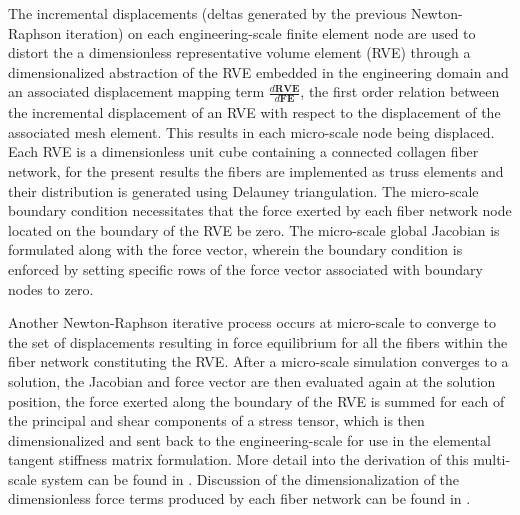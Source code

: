 \documentclass[11pt]{siamltex1213}
\begin{document}
The incremental displacements (deltas generated by the previous Newton-Raphson iteration) on each engineering-scale finite element node are used to distort the a dimensionless representative volume element (RVE) through a dimensionalized abstraction of the RVE embedded in the engineering domain and an associated displacement mapping term $\frac{d\mathbf{RVE}}{d\mathbf{FE}}$, the first order relation between the incremental displacement of an RVE with respect to the displacement of the associated mesh element. This results in each micro-scale node being displaced. Each RVE is a dimensionless unit cube containing a connected collagen fiber network, for the present results the fibers are implemented as truss elements and their distribution is generated using Delauney triangulation. The micro-scale boundary condition necessitates that the force exerted by each fiber network node located on the boundary of the RVE be zero. The micro-scale global Jacobian is formulated along with the force vector, wherein the boundary condition is enforced by setting specific rows of the force vector associated with boundary nodes to zero. 

Another Newton-Raphson iterative process occurs at micro-scale to converge to the set of displacements resulting in force equilibrium for all the fibers within the fiber network constituting the RVE. After a micro-scale simulation converges to a solution, the Jacobian and force vector are then evaluated again at the solution position, the force exerted along the boundary of the RVE is summed for each of the principal and shear components of a stress tensor, which is then dimensionalized and sent back to the engineering-scale for use in the elemental tangent stiffness matrix formulation. More detail into the derivation of this multi-scale system can be found in \cite{stylianopoulos2008thesis} \cite{agoram2001coupled} \cite{stylianopoulos2007multiscale} . Discussion of the dimensionalization of the dimensionless force terms produced by each fiber network can be found in \cite{stylianopoulos2007volume} \cite{chandran2007deterministic}.

\end{document}
